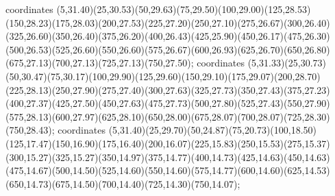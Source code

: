  coordinates {(5,31.40)(25,30.53)(50,29.63)(75,29.50)(100,29.00)(125,28.53)(150,28.23)(175,28.03)(200,27.53)(225,27.20)(250,27.10)(275,26.67)(300,26.40)(325,26.60)(350,26.40)(375,26.20)(400,26.43)(425,25.90)(450,26.17)(475,26.30)(500,26.53)(525,26.60)(550,26.60)(575,26.67)(600,26.93)(625,26.70)(650,26.80)(675,27.13)(700,27.13)(725,27.13)(750,27.50)};
 coordinates {(5,31.33)(25,30.73)(50,30.47)(75,30.17)(100,29.90)(125,29.60)(150,29.10)(175,29.07)(200,28.70)(225,28.13)(250,27.90)(275,27.40)(300,27.63)(325,27.73)(350,27.43)(375,27.23)(400,27.37)(425,27.50)(450,27.63)(475,27.73)(500,27.80)(525,27.43)(550,27.90)(575,28.13)(600,27.97)(625,28.10)(650,28.00)(675,28.07)(700,28.07)(725,28.30)(750,28.43)};
 coordinates {(5,31.40)(25,29.70)(50,24.87)(75,20.73)(100,18.50)(125,17.47)(150,16.90)(175,16.40)(200,16.07)(225,15.83)(250,15.53)(275,15.37)(300,15.27)(325,15.27)(350,14.97)(375,14.77)(400,14.73)(425,14.63)(450,14.63)(475,14.67)(500,14.50)(525,14.60)(550,14.60)(575,14.77)(600,14.60)(625,14.53)(650,14.73)(675,14.50)(700,14.40)(725,14.30)(750,14.07)};
